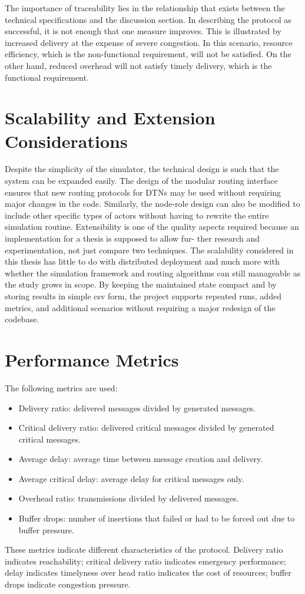 The importance of traceability lies in the relationship that exists between the
technical specifications and the discussion section. In describing the protocol as successful,
it is not enough that one measure improves. This is illustrated by increased delivery at the
expense of severe congestion. In this scenario, resource efficiency, which is the
non-functional requirement, will not be satisfied. On the other hand, reduced overhead will
not satisfy timely delivery, which is the functional requirement.

\section{Scalability and Extension Considerations}
Despite the simplicity of the simulator, the technical design is such that the system
can be expanded easily. The design of the modular routing interface ensures that new
routing protocols for DTNs may be used without requiring major changes in the code.
Similarly, the node-role design can also be modified to include other specific types of
actors without having to rewrite the entire simulation routine. Extensibility is one of the
quality aspects required because an implementation for a thesis is supposed to allow fur-
ther research and experimentation, not just compare two techniques.
The scalability considered in this thesis has little to do with distributed deployment
and much more with whether the simulation framework and routing algorithms can still manageable as the study grows in scope. By keeping the maintained state compact and by storing results in simple \ac{csv} form, the project supports repeated runs, added metrics, and additional scenarios without requiring a major redesign of the codebase.

\section{Performance Metrics}
The following metrics are used:

\begin{itemize}
	\item Delivery ratio: delivered messages divided by generated messages.
	\item Critical delivery ratio: delivered critical messages divided by generated critical messages.
	\item Average delay: average time between message creation and delivery.
	\item Average critical delay: average delay for critical messages only.
	\item Overhead ratio: transmissions divided by delivered messages.
	\item Buffer drops: number of insertions that failed or had to be forced out due to buffer pressure.
\end{itemize}


These metrics indicate different characteristics of the protocol. Delivery ratio indicates reachability; critical delivery ratio indicates emergency performance; delay indicates timelyness over head ratio indicates the cost of resources; buffer drops indicate congestion pressure.
